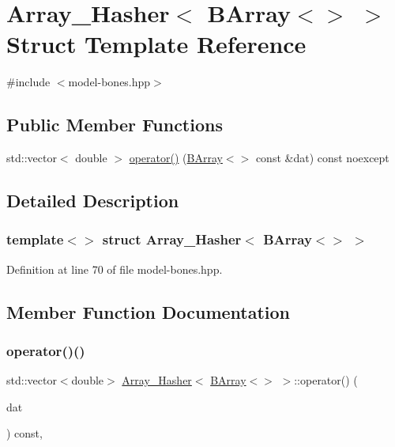 \hypertarget{struct_array___hasher_3_01_b_array_3_4_01_4}{}\section{Array\+\_\+\+Hasher$<$ B\+Array$<$$>$ $>$ Struct Template Reference}
\label{struct_array___hasher_3_01_b_array_3_4_01_4}


{\ttfamily \#include $<$model-\/bones.\+hpp$>$}

\subsection*{Public Member Functions}
\begin{DoxyCompactItemize}
\item 
std\+::vector$<$ double $>$ \hyperlink{struct_array___hasher_3_01_b_array_3_4_01_4_a5a40ad373242142e6e8ca77611fb1be3}{operator()} (\hyperlink{class_b_array}{B\+Array}$<$$>$ const \&dat) const noexcept
\end{DoxyCompactItemize}


\subsection{Detailed Description}
\subsubsection*{template$<$$>$\newline
struct Array\+\_\+\+Hasher$<$ B\+Array$<$$>$ $>$}



Definition at line 70 of file model-\/bones.\+hpp.



\subsection{Member Function Documentation}
\mbox{\label{struct_array___hasher_3_01_b_array_3_4_01_4_a5a40ad373242142e6e8ca77611fb1be3}} 
\subsubsection{\texorpdfstring{operator()()}{operator()()}}
{\footnotesize\ttfamily std\+::vector$<$double$>$ \hyperlink{struct_array___hasher}{Array\+\_\+\+Hasher}$<$ \hyperlink{class_b_array}{B\+Array}$<$$>$ $>$\+::operator() (\begin{DoxyParamCaption}\item[{\hyperlink{class_b_array}{B\+Array}$<$$>$ const \&}]{dat }\end{DoxyParamCaption}) const\hspace{0.3cm}{\ttfamily [inline]}, {\ttfamily [noexcept]}}




